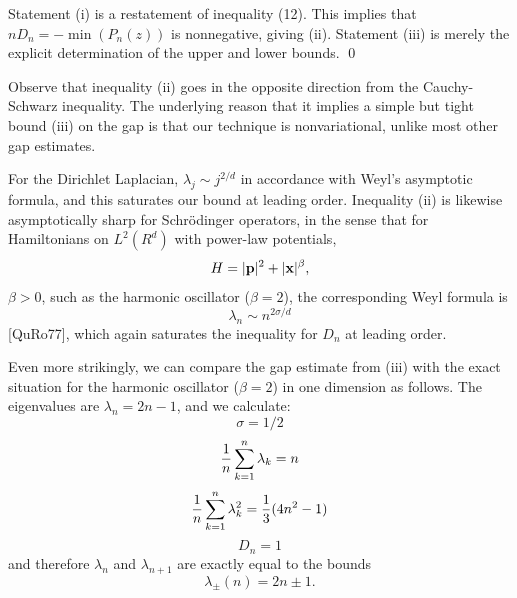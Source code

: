 Statement (i) is a restatement of inequality (12).  
This implies that $n D_n = - 
\min(P_n(z))$ is nonnegative, giving (ii).  
Statement (iii) is merely the explicit 
determination of the upper and lower bounds.
\hfill\qed
\enddemo

Observe that inequality (ii) goes in the opposite direction 
from the Cauchy-Schwarz inequality.  The underlying reason that it implies 
a simple but tight bound (iii) on the gap is that our technique is 
nonvariational, unlike most other gap estimates. 

For the Dirichlet Laplacian, $\lambda_j \sim j^{2/d}$ in accordance with 
Weyl's asymptotic formula, and this saturates our bound at leading order.  
Inequality (ii) is likewise asymptotically sharp for Schr\"odinger operators, 
in the sense that for Hamiltonians on $L^2(R^d)$ with power-law potentials,
$$H = |{\bold p}|^2 + |{\bold x}|^{\beta},$$
$\beta> 0$, such as the harmonic oscillator ($\beta=2$), 
the corresponding Weyl 
formula is
$$ \lambda_n \sim n^{2 \sigma /d} $$
[QuRo77], which again saturates the inequality for $D_n$ at leading order. 

Even more strikingly, we can compare the gap estimate from (iii) with the 
exact situation for the harmonic oscillator ($\beta=2$) in one dimension as 
follows.  The eigenvalues are $\lambda_n  = 2n-1$, and we calculate:
$$
\sigma = 1/2$$
$$
{1 \over n}\sum\limits_{k = 1}^{n} \lambda_k=
n $$
$$
{1 \over n}\sum\limits_{k = 1}^{n} \lambda_k^{2} =
 {1 \over 3}(4n^2 -1)$$
$$D_n= 1$$
and therefore $\lambda_n$ and $\lambda_{n+1}$ are exactly equal to the 
bounds 
$$
\lambda_\pm(n) = 2n\pm1. $$
\enddemo

